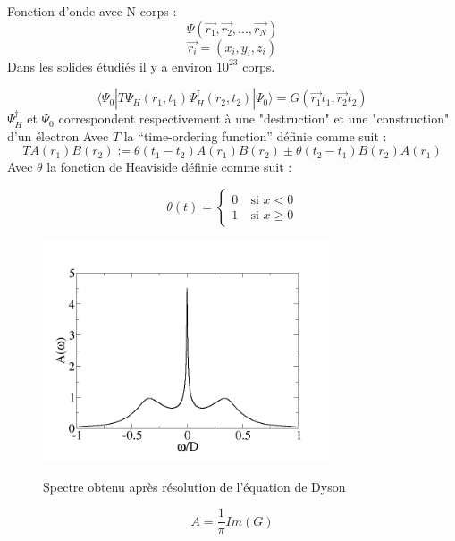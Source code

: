 \documentclass{beamer}
\begin{document}
\begin{frame}
Fonction d'onde avec N corps :
\begin{equation}
 \Psi(\vec{r_1}, \vec{r_2}, ..., \vec{r_N})
\end{equation}
\begin{equation}
 \vec{r_i} = (x_i, y_i, z_i)
\end{equation}
Dans les solides \'etudi\'es il y a environ $10^{23}$ corps.
\end{frame}







\begin{frame}
 \begin{equation}
 \langle \Psi_0 | T \Psi_H (r_1, t_1) \Psi_H^\dagger (r_2, t_2) | \Psi_0 \rangle = G(\vec{r_1} t_1, \vec{r_2}  t_2)
\end{equation}
$\Psi_H^\dagger$ et $\Psi_0$ correspondent respectivement à une "destruction" et une "construction" d'un \'electron
Avec $T$ la ``time-ordering function'' d\'efinie comme suit :
\begin{equation}
 T{A(r_1)B(r_2)} := \theta(t_1 - t_2)A(r_1)B(r_2) \pm \theta(t_2 - t_1)B(r_2) A(r_1)
\end{equation}
Avec $\theta$ la fonction de Heaviside d\'efinie comme suit :

\begin{equation}
\theta(t) = 
\left\{ \begin{array}{rl}
 0 &\ \text{si }x <0\\
 1 &\ \text{si }x \geq 0
\end{array} \right.
\end{equation}


\end{frame}


\begin{frame}
 \begin{figure}
\caption{Spectre obtenu apr\`es r\'esolution de l'\'equation de Dyson}
\includegraphics[width = 85mm]{spectre.png}
\label{solb}
\end{figure}
\begin{equation}
 A = \frac{1}{\pi}Im(G)
\end{equation}
\end{frame}
\end{document}
